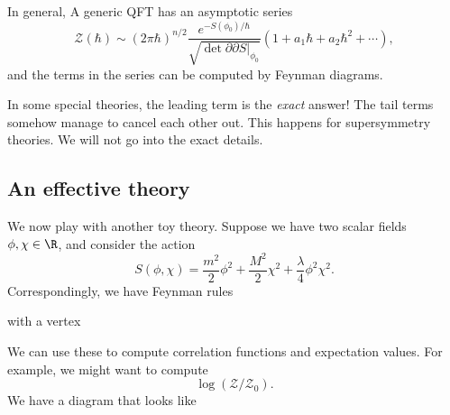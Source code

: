 \documentclass[a4paper]{article}
\begin{document}
In general, A generic QFT has an asymptotic series
\[
  \mathcal{Z}(\hbar) \sim (2\pi \hbar)^{n/2}\frac{e^{-S(\phi_0)/\hbar}}{\sqrt{ \det \partial \partial S|_{\phi_0}}} (1 + a_1 \hbar + a_2 \hbar^2 + \cdots),
\]
and the terms in the series can be computed by Feynman diagrams.

In some special theories, the leading term is the \emph{exact} answer! The tail terms somehow manage to cancel each other out. This happens for supersymmetry theories. We will not go into the exact details.

\subsection{An effective theory}
We now play with another toy theory. Suppose we have two scalar fields $\phi, \chi \in \R$, and consider the action
\[
  S(\phi, \chi) = \frac{m^2}{2}\phi^2 + \frac{M^2}{2} \chi^2 + \frac{\lambda}{4} \phi^2 \chi^2.
\]
Correspondingly, we have Feynman rules
\begin{center}
  \quad\quad
\end{center}
with a vertex
\begin{center}
\end{center}
We can use these to compute correlation functions and expectation values.
For example, we might want to compute
\[
  \log (\mathcal{Z}/\mathcal{Z}_0).
\]
We have a diagram that looks like
\end{document}
